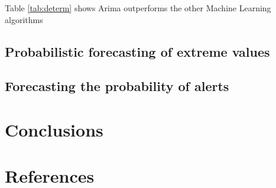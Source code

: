 \documentclass[a4paper,twocolumn,5p]{elsarticle}
\begin{document}
Table \ref{tab:determ} shows Arima outperforms the other Machine Learning algorithms


\subsection{Probabilistic forecasting of extreme values}
\label{sec:probabilistic}


\subsection{Forecasting the probability of alerts}
\label{sec:alertProb2}


\section{Conclusions}
\label{sec:concl}


\section*{References}


\end{document}
